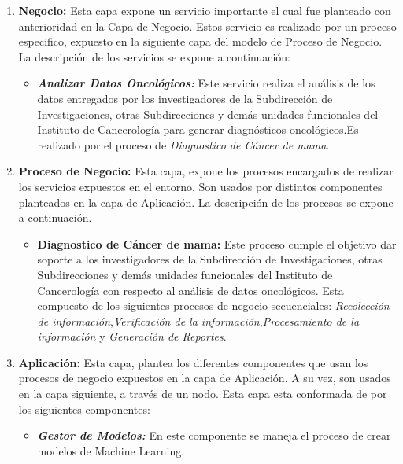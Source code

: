 \begin{enumerate}[label=\textbf{\arabic*})]
	
\item  \textbf{Negocio:} Esta capa expone un servicio importante el cual fue planteado con anterioridad en la Capa de Negocio. Estos  servicio es realizado por un proceso especifico, expuesto en la siguiente capa del modelo de Proceso de Negocio. La descripción de los servicios
	se expone a continuación:
	\begin{itemize}
		\item  \textbf{\textit{Analizar Datos Oncológicos:}} Este servicio realiza el análisis de los datos entregados por  los investigadores de la Subdirección de Investigaciones, otras Subdirecciones y demás unidades funcionales del Instituto de Cancerología para generar diagnósticos oncológicos.Es realizado por el proceso de \textit{Diagnostico de Cáncer de mama}.
	\end{itemize}

\item  \textbf{Proceso de Negocio:} Esta capa, expone los procesos encargados de realizar los servicios expuestos en el entorno. Son usados por distintos componentes planteados en la capa de Aplicación. La descripción de los procesos se expone a continuación.
	
	\begin{itemize}
	\item  \textbf{Diagnostico de Cáncer de mama:}  Este proceso cumple el objetivo dar soporte a los investigadores de la Subdirección de Investigaciones, otras Subdirecciones y demás unidades funcionales del Instituto de Cancerología con respecto al análisis de datos oncológicos. Esta compuesto de los siguientes procesos de negocio secuenciales: \textit{Recolección de información},\textit{Verificación de la información},\textit{Procesamiento de la información} y \textit{Generación  de Reportes}.
	\end{itemize}


\item  \textbf{Aplicación:} Esta capa, plantea los diferentes componentes que usan los procesos de negocio expuestos en la capa de Aplicación. A su vez, son usados en la capa siguiente, a través de un nodo. Esta capa esta conformada de por los siguientes componentes:

\begin{itemize}
	\item  \textbf{\textit{Gestor de Modelos:}} En este componente se maneja el proceso de crear modelos de Machine Learning.
	

\end{itemize}
\end{enumerate}
